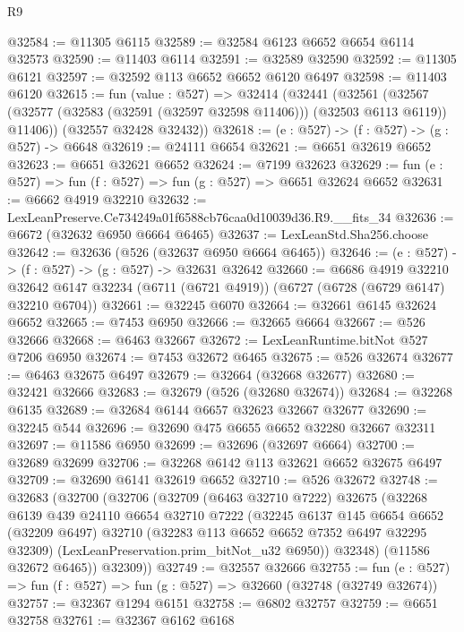 \begin{lexlean}{R9}
\begin{coremodule}
@32584 := @11305 @6115
@32589 := @32584 @6123 @6652 @6654 @6114 @32573
@32590 := @11403 @6114
@32591 := @32589 @32590
@32592 := @11305 @6121
@32597 := @32592 @113 @6652 @6652 @6120 @6497
@32598 := @11403 @6120
@32615 := fun (value : @527) =>
  @32414
    (@32441
      (@32561
        (@32567 (@32577 (@32583 (@32591 (@32597 @32598 @11406))) (@32503 @6113 @6119)) @11406))
      (@32557 @32428 @32432))
@32618 := (e : @527) -> (f : @527) -> (g : @527) -> @6648
@32619 := @24111 @6654
@32621 := @6651 @32619 @6652
@32623 := @6651 @32621 @6652
@32624 := @7199 @32623
@32629 := fun (e : @527) => fun (f : @527) => fun (g : @527) => @6651 @32624 @6652
@32631 := @6662 @4919 @32210
@32632 := LexLeanPreserve.Ce734249a01f6588cb76caa0d10039d36.R9.__fits_34
@32636 := @6672 (@32632 @6950 @6664 @6465)
@32637 := LexLeanStd.Sha256.choose
@32642 := @32636 (@526 (@32637 @6950 @6664 @6465))
@32646 := (e : @527) -> (f : @527) -> (g : @527) -> @32631 @32642
@32660 := @6686
    @4919
    @32210
    @32642
    @6147
    @32234
    (@6711 (@6721 @4919))
    (@6727 (@6728 (@6729 @6147) @32210 @6704))
@32661 := @32245 @6070
@32664 := @32661 @6145 @32624 @6652
@32665 := @7453 @6950
@32666 := @32665 @6664
@32667 := @526 @32666
@32668 := @6463 @32667
@32672 := LexLeanRuntime.bitNot @527 @7206 @6950
@32674 := @7453 @32672 @6465
@32675 := @526 @32674
@32677 := @6463 @32675 @6497
@32679 := @32664 (@32668 @32677)
@32680 := @32421 @32666
@32683 := @32679 (@526 (@32680 @32674))
@32684 := @32268 @6135
@32689 := @32684 @6144 @6657 @32623 @32667 @32677
@32690 := @32245 @544
@32696 := @32690 @475 @6655 @6652 @32280 @32667 @32311
@32697 := @11586 @6950
@32699 := @32696 (@32697 @6664)
@32700 := @32689 @32699
@32706 := @32268 @6142 @113 @32621 @6652 @32675 @6497
@32709 := @32690 @6141 @32619 @6652
@32710 := @526 @32672
@32748 := @32683
    (@32700
      (@32706
        (@32709
          (@6463 @32710 @7222)
          @32675
          (@32268
            @6139
            @439
            @24110
            @6654
            @32710
            @7222
            (@32245
              @6137
              @145
              @6654
              @6652
              (@32209 @6497)
              @32710
              (@32283 @113 @6652 @6652 @7352 @6497 @32295 @32309)
              (LexLeanPreservation.prim_bitNot_u32 @6950))
            @32348)
          (@11586 @32672 @6465))
        @32309))
@32749 := @32557 @32666
@32755 := fun (e : @527) => fun (f : @527) => fun (g : @527) => @32660 (@32748 (@32749 @32674))
@32757 := @32367 @1294 @6151
@32758 := @6802 @32757
@32759 := @6651 @32758
@32761 := @32367 @6162 @6168

\end{coremodule}
\end{lexlean}

